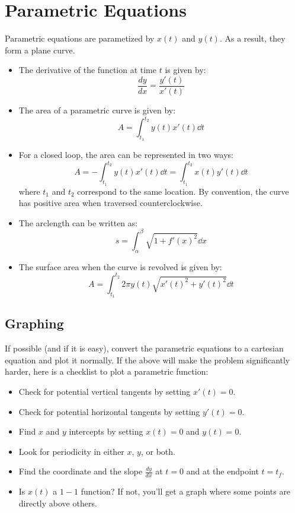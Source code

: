 \documentclass{article}
\begin{document}
    \section{Parametric Equations}
    Parametric equations are parametized by $x(t)$ and $y(t)$. As a result, they form a plane curve.
    \begin{itemize}
        \item The derivative of the function at time $t$ is given by:
        \begin{equation}
            \frac{dy}{dx} = \frac{y'(t)}{x'(t)}
        \end{equation}
        \item The area of a parametric curve is given by:
        \begin{equation}
            A = \int_{t_1}^{t_2} y(t)x'(t) \dd{t}
        \end{equation}
        \item For a closed loop, the area can be represented in two ways:
        \begin{equation}
            A = -\int_{t_1}^{t_2} y(t)x'(t) \dd{t} = \int_{t_1}^{t_2} x(t)y'(t) \dd{t}
        \end{equation}
        where $t_1$ and $t_2$ correspond to the same location. By convention, the curve has positive area when traversed counterclockwise.
        \item The arclength can be written as:
        \begin{equation}
            s = \int_\alpha^\beta \sqrt{1+f'(x)^2}\dd{x}
        \end{equation}
        \item The surface area when the curve is revolved is given by:
        \begin{equation}
            A = \int_{t_1}^{t_2} 2\pi y(t)\sqrt{x'(t)^2+y'(t)^2} \dd{t}
        \end{equation}
    \end{itemize}
    \subsection{Graphing}
    If possible (and if it is easy), convert the parametric equations to a cartesian equation and plot it normally. If the above will make the problem significantly harder, here is a checklist to plot a parametric function:
    \begin{itemize}
        \item Check for potential vertical tangents by setting $x'(t)=0$.
        \item Check for potential horizontal tangents by setting $y'(t)=0$.
        \item Find $x$ and $y$ intercepts by setting $x(t)=0$ and $y(t)=0$.
        \item Look for periodicity in either $x$, $y$, or both.
        \item Find the coordinate and the slope $\frac{dy}{dx}$ at $t=0$ and at the endpoint $t=t_f$.
        \item Is $x(t)$ a $1-1$ function? If not, you'll get a graph where some points are directly above others.
    \end{itemize}
\end{document}
